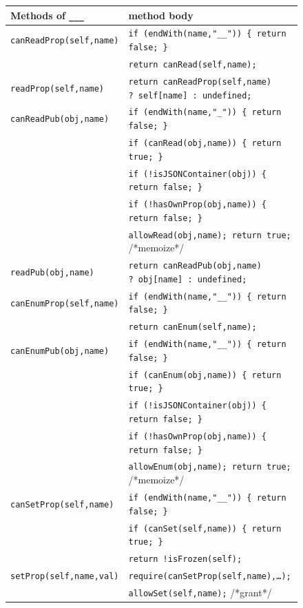 \documentclass[letterpaper,twocolumn,10pt]{article}
\newcommand{\code}[1]{{\tt {#1}}}              %
\begin{document}
\begin{figure}
\begin{tabular}{ll}
  Methods of \code{\_\_\_}  & method body \\ 
  \hline 
  \code{canReadProp(self,name)}
       & \code{if (endWith(name,"\_\_"))\ \{ return false; \}} \\
       & \code{return canRead(self,name);} \\
  \code{readProp(self,name)}
       & \code{return canReadProp(self,name) ?\ self[name] :\ undefined;} \\
  \code{canReadPub(obj,name)}
       & \code{if (endWith(name,"\_"))\ \{ return false; \}} \\
       & \code{if (canRead(obj,name))\ \{ return true; \}} \\
       & \code{if (!isJSONContainer(obj))\ \{ return false; \}} \\
       & \code{if (!hasOwnProp(obj,name))\ \{ return false; \}} \\
       & \code{allowRead(obj,name); return true;} /*memoize*/ \\
  \code{readPub(obj,name)}
       & \code{return canReadPub(obj,name) ?\ obj[name] :\ undefined;} \\
  \hline
  \code{canEnumProp(self,name)} 
       & \code{if (endWith(name,"\_\_"))\ \{ return false; \}} \\
       & \code{return canEnum(self,name);} \\
  \code{canEnumPub(obj,name)}
       & \code{if (endWith(name,"\_\_"))\ \{ return false; \}} \\
       & \code{if (canEnum(obj,name))\ \{ return true; \}} \\
       & \code{if (!isJSONContainer(obj))\ \{ return false; \}} \\
       & \code{if (!hasOwnProp(obj,name))\ \{ return false; \}} \\
       & \code{allowEnum(obj,name); return true;} /*memoize*/ \\
  \hline
  \code{canSetProp(self,name)}
       & \code{if (endWith(name,"\_\_"))\ \{ return false; \}} \\
       & \code{if (canSet(self,name))\ \{ return true; \}} \\
       & \code{return !isFrozen(self);} \\
  \code{setProp(self,name,val)}
       & \code{require(canSetProp(self,name),\ldots);} \\
       & \code{allowSet(self,name);} /*grant*/ \\

\end{tabular}
\end{figure}
\end{document}
